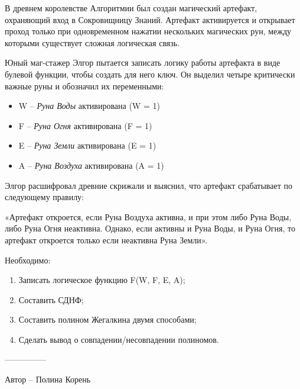 \question
В древнем королевстве Алгоритмии был создан магический артефакт, охраняющий вход в Сокровищницу Знаний. Артефакт активируется и открывает проход только при одновременном нажатии нескольких магических рун, между которыми существует сложная логическая связь.

Юный маг-стажер Элгор пытается записать логику работы артефакта в виде булевой функции, чтобы создать для него ключ. Он выделил четыре критически важные руны и обозначил их переменными:

\begin{itemize}
\item W – \textit{Руна Воды} активирована (W = 1)
\item F – \textit{Руна Огня} активирована (F = 1)
\item E – \textit{Руна Земли} активирована (E = 1)
\item A – \textit{Руна Воздуха} активирована (A = 1)
\end{itemize}

Элгор расшифровал древние скрижали и выяснил, что артефакт срабатывает по следующему правилу:

«Артефакт откроется, если Руна Воздуха активна, и при этом либо Руна Воды, либо Руна Огня неактивна. Однако, если активны и Руна Воды, и Руна Огня, то артефакт откроется только если неактивна Руна Земли».

Необходимо:
\begin{enumerate}
    \item Записать логическое функцию F(W, F, E, A);
    \item Составить СДНФ;
    \item Составить полином Жегалкина двумя способами;
    \item Сделать вывод о совпадении/несовпадении полиномов.
\end{enumerate}

  ---------------

Автор -- Полина Корень